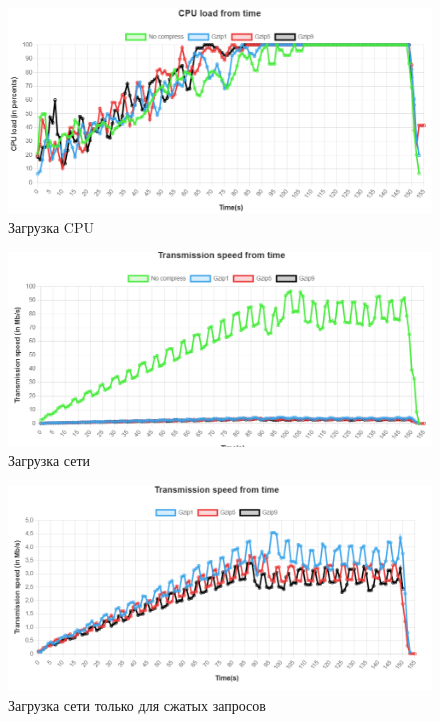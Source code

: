 \documentclass[12pt]{article}
\begin{document}
\begin{figure}[H]
    \centering
    \includegraphics[width=1\textwidth]{../images/second_part/CPU_load.png}
    \caption{Загрузка CPU}
\end{figure}

\begin{figure}[H]
    \centering
    \includegraphics[width=1\textwidth]{../images/second_part/Transmission_speed.png}
    \caption{Загрузка сети}
\end{figure}

\begin{figure}[H]
    \centering
    \includegraphics[width=1\textwidth]{../images/second_part/Transmission_speed_withot_nocompress.png}
    \caption{Загрузка сети только для сжатых запросов}
\end{figure}
\end{document}
